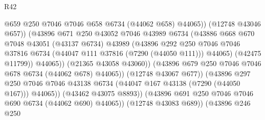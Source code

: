 \begin{lexlean}{R42}
\begin{coremodule}
{                                            @659
                                            @250
                                            @7046
                                            @7046
                                            @658
                                            @6734
                                            (@44062 @658)
                                            @44065))
                                        (@12748 @43046 @657))
                                      (@43896
                                        @671
                                        @250
                                        @43052
                                        @7046
                                        @43989
                                        @6734
                                        (@43886
                                          @668
                                          @670
                                          @7048
                                          @43051
                                          (@43137 @6734)
                                          @43989
                                          (@43896
                                            @292
                                            @250
                                            @7046
                                            @7046
                                            @37816
                                            @6734
                                            (@44047 @111 @37816 (@7290 (@44050 @111)))
                                            @44065)
                                          (@42475 @11799))
                                        @44065))
                                    (@21365 @43058 @43060))
                                  (@43896 @679 @250 @7046 @7046 @678 @6734 (@44062 @678) @44065))
                                (@12748 @43067 @677))
                              (@43896
                                @297
                                @250
                                @7046
                                @7046
                                @43138
                                @6734
                                (@44047 @167 @43138 (@7290 (@44050 @167)))
                                @44065))
                            (@43462 @43075 @8893))
                          (@43896 @691 @250 @7046 @7046 @690 @6734 (@44062 @690) @44065))
                        (@12748 @43083 @689))
                      (@43896
                        @246
                        @250
}
\end{coremodule}
\end{lexlean}
